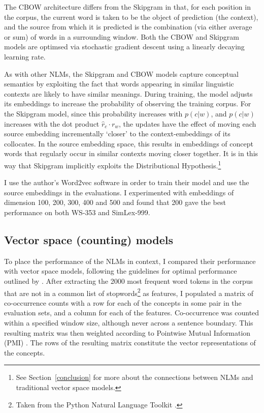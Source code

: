 The CBOW architecture differs from the Skipgram in that, for each position in the corpus, the current word is taken to be the object of prediction (the context), and the source from which it is predicted is the combination (via either average or sum) of words in a surrounding window. Both the CBOW and Skipgram models are optimsed via stochastic gradient descent using a linearly decaying learning rate. 

As with other NLMs, the Skipgram and CBOW models capture conceptual semantics by exploiting the fact that words appearing in similar linguistic contexts are likely to have similar meanings. During training, the model adjusts its embeddings to increase the probability of observing the training corpus. For the Skipgram model, since this probability increases with \(p(c|w)\), and \(p(c|w)\) increases with the dot product \( \hat{r}_c\cdot r_{w} \), the updates have the effect of moving each source embedding incrementally `closer' to the context-embeddings of its collocates. In the source embedding space, this results in embeddings of concept words that regularly occur in similar contexts moving closer together. It is in this way that Skipgram implicitly exploits the Distributional Hypothesis.\footnote{See Section~\ref{conclusion} for more about the connections between NLMs and traditional vector space models.}

I use the author's Word2vec software in order to train their model and use the source embeddings in the evaluations. I experimented with embeddings of dimension 100, 200, 300, 400 and 500 and found that 200 gave the best performance on both WS-353 and SimLex-999. 

\subsection{Vector space (counting) models}

To place the performance of the NLMs in context, I compared their performance with vector space models, following the guidelines for optimal performance outlined by \cite{kiela2014systematic}. After extracting the 2000 most frequent word tokens in the corpus that are not in a common list of stopwords\footnote{Taken from the Python Natural Language Toolkit \citep{bird2006nltk}.} as features, I populated a matrix of co-occurrence counts with a row for each of the concepts in some pair in the evaluation sets, and a column for each of the features. Co-occurrence was counted within a specified window size, although never across a sentence boundary. This resulting matrix was then weighted according to Pointwise Mutual Information (PMI) \citep{recchia2009more}. The rows of the resulting matrix constitute the vector representations of the concepts.   

